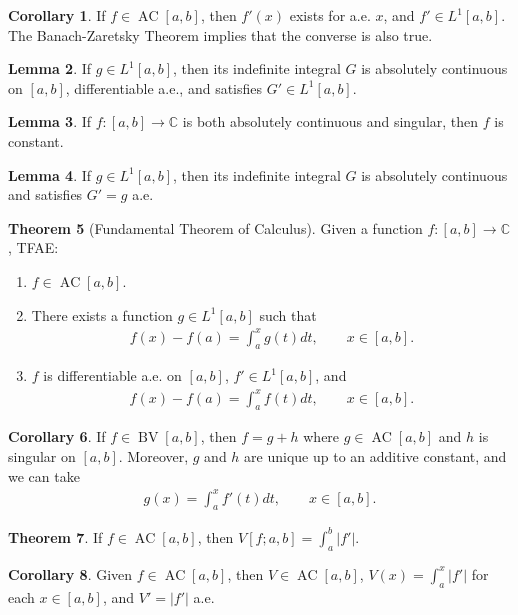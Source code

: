 \documentclass[a4paper,9pt]{extarticle}
\DeclareMathOperator*{\BV}{BV}
\DeclareMathOperator*{\AC}{AC}
\theoremstyle{definition}
\newtheorem{thm}{Theorem}
\newtheorem{lem}[thm]{Lemma}
\newtheorem{cor}[thm]{Corollary}
\begin{document}
\begin{cor}
    If $f \in \AC[a, b]$, then $f'(x)$ exists for a.e. $x$, and $f' \in L^1[a, b]$. The Banach-Zaretsky Theorem implies that the converse is also true.
\end{cor}
\begin{lem}
    If $g \in L^1[a, b]$, then its indefinite integral $G$ is absolutely continuous on $[a, b]$, differentiable a.e., and satisfies $G' \in L^1[a, b]$.
\end{lem}
\begin{lem}
    If $f : [a, b] \to \mathbb{C}$ is both absolutely continuous and singular, then $f$ is constant.
\end{lem}
\begin{lem}
    If $g \in L^1[a, b]$, then its indefinite integral $G$ is absolutely continuous and satisfies $G' = g$ a.e.
\end{lem}
\begin{thm}[Fundamental Theorem of Calculus]
    Given a function $f : [a, b] \to \mathbb{C}$, TFAE:
    \begin{enumerate}[itemsep=0ex]
        \item
            $f \in \AC[a, b].$
        \item
            There exists a function $g \in L^1[a, b]$ such that
            \begin{align*}
                f(x) - f(a) = \int_a^x g(t) dt, \qquad x \in [a, b].
            \end{align*}
        \item
            $f$ is differentiable a.e. on $[a, b]$, $f' \in L^1[a, b]$, and
            \begin{align*}
                f(x) - f(a) = \int_a^x f(t) dt, \qquad x \in [a, b].
            \end{align*}
    \end{enumerate}
\end{thm}
\begin{cor}
    If $f \in \BV[a, b]$, then $f = g + h$ where $g \in \AC[a, b]$ and $h$ is singular on $[a, b]$. Moreover, $g$ and $h$ are unique up to an additive constant, and we can take
    \begin{align*}
        g(x) = \int_a^x f'(t) dt, \qquad x \in [a, b].
    \end{align*}
\end{cor}
\begin{thm}
    If $f \in \AC[a, b]$, then $V[f; a, b] = \int_a^b |f'|$.
\end{thm}
\begin{cor}
    Given $f \in \AC[a, b]$, then $V \in \AC[a, b]$, $V(x) = \int_a^x |f'|$ for each $x \in [a, b]$, and $V' = |f'|$ a.e.
\end{cor}
\end{document}
